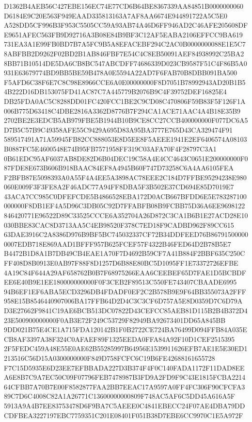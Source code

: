 \documentclass[UTF8,fontset=fandol,zihao=-4,a4paper]{ctexart}
\begin{document}
{{D1362B4AEB56C427EBE156EC74E77CD6B64BE8367339AA84851B0000000060D6184E9C20E563F949EAAD335813163A7AF8AA6674E944891722A5C5E0
A528DD5CF996B3F953C5505CC59A93AB74A46D6FF946AD2C46AFE205608DFE9651AFEC563FB9D92716A3B08E84B9BF3C12AF5EABA2106EFFCC9BA619
731EA3A1E99FB0BD7B7A5FC9B5A8EFACEBF294C2AC0B0000000088E1E5C78ABFBB2D9262F02BD2B1AB846FBF7E54C4C8EB50091AEF84938992C25BA2
8BB71B10514DE5DA6CB8BC547ABCDFF74686339D023CB9587F51C4F86B5A0931E63679774BD9BB5BE59B478A0E5594A22AD7F6FAB70B8DBB091BA500
F5AFD6C38F6E7C8C98E8966CCE6A0E00000000F8D7051B78992943AD20B1B54B222D16DB153075FD41AC87C7A445779B2076B9C4F39752DEF16825E4
DB25FDA0AC5C8288DD01FC420FCC1BE2C9CD08C470806F59B83F5F126F1A006B775D63418C4DBE2816A3362D8776B7F294CA1ACE71AAC4A4B18E35B9
2702BE2E3EDCB5AB979FBE5B1944B10B9CE8CC27CCB400000000F077DC6A5D7B5C57B9C49358AFE55C9429A695D83A95BA3777E765D43CA329474F91
589517491A71A59945FB82CC888053E8D5EE8F5AEEE1941E2EF6406574A08103B0887FC5E4600548E74B95FB7571958FF319C03AFA70F4F28797C3A1
0B61EDC95AF6037AB8DE82D6B04DEC19C58A4E4CC4643C0651E200000000F087FDE8E673B606B918BAAC84EF8A4945B60F747D73258C6A4AA6105FEA
F2BFB87E5098393A0A55F4A4EE5A3898AC78EEE2C184D7FFBE95294238E980060E009F3F3FE8A2F46ADC77A94FF8DBA5F3B502E37CD694E85D7019E7
43ACA7CC985C0DFEFCDE5B4866528EBA172D0ACB667BFDD6E5E783287100000000F8DB1EF4A5D96C3DB05C92D7FFABFB08B9FCBB75D36A6EE9698122
846420771E96522D89C33525CCCE6A352704A26D872C3CA1B6B1E27ACD28E10030BBE83CAC8D3713AA5C4EB98520F378C7ED18F9CADBD962F89CC615
63DAE3916C2A8386D976B9BF5BC745032337CF72B34DDFEED76B867915000000007EDB718E869AAD1BFFF957B625FCEF57F4322B46FED64D2B78B5E7
B4472B1D8A1B7DB49CB4EAE1A70F7D4692B59CF7A41B884F2BBF635C250CFF408D8B0913E0AB97F88F8D1257D6B88E80BC5D1095FF1E73372726EFBE
4A19C84F644A29AF658762B0B7F68975266EAA6CEEBEF65D7FAE1D5BCBDFEE6E40B9E1EE180000000000F0F3CEB2F89513C550FE743407CBAADE6995
94B6EF1EF6ABA5ECD3296DB4FDADF0EF2C2B578B9E9F64BB355073A2FFF958E15B8546440907006BA17FFB64D2D4C3C3CF6D757A5E8D0359D7C6D79A
D3E27662F9841C19AE6BCB513DC07822D43CEFCC85AEB81D115B2B4B372D423E500900000000F0AB3E72F249C53729F82949BA92673401DD65A845BB
9DD021B75E4CE1A715FDA120142B1F0B2722CE724BA76499D094FFB84A035ECB8AF3397A38F324C0AFAEF89F1325EEDA0FFA84A92F10D1CEF2515395
2F5FEDC459A48E55E0AE62B55285997B64956E1539911626EFB7AE1E5E30ED1213516C56D15A0300000000F849D758FCFC6C19B6FE42688161655728
F7C15D5935E6D23EE7EFBBADA227D3B374F4F0C140FADA1172F11DAD8EEA6E8B7C9A7EC50C09F07796FEB7478987B3FD9A2FD9F9C43E1815FCBA2214
64CFBB7A70B7E00F8582877FAA2BB7EEAC17A9597A0FF4FC306F90CFCFA389C7D6C4008C82A1A26771C13600000000809F748AC5AF6C5DD45A616A5F
5913A9A4B7EE83753478D6F9BA7C5AEEE0C4841EBECC24F07AE4DBA79DDCDFBEA3227197EBC7759351C201E08401F051B38D7EBE6CC9970C1E5A972F
}}
\end{document}
